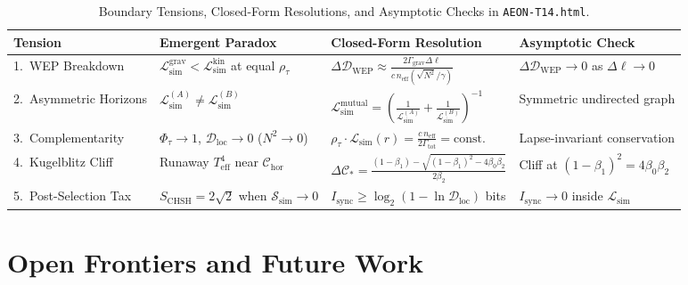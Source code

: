 \documentclass[11pt,a4paper]{article}
\begin{document}
\begin{table}[h!]
\centering
\caption{Boundary Tensions, Closed-Form Resolutions, and Asymptotic Checks in \texttt{AEON-T14.html}.}
\vspace{0.5em}
\small
\begin{tabular}{@{}llll@{}}
\toprule
\textbf{Tension} & \textbf{Emergent Paradox} & \textbf{Closed-Form Resolution} & \textbf{Asymptotic Check} \\
\midrule
1.\ WEP Breakdown & $\mathcal{L}_{\mathrm{sim}}^{\mathrm{grav}} < \mathcal{L}_{\mathrm{sim}}^{\mathrm{kin}}$ at equal $\rho_\tau$ & $\Delta\mathcal{D}_{\mathrm{WEP}} \approx \frac{2\Gamma_{\mathrm{grav}}\Delta\ell}{c\,n_{\mathrm{eff}}(\sqrt{N^2}/\gamma)}$ & $\Delta\mathcal{D}_{\mathrm{WEP}} \to 0$ as $\Delta\ell \to 0$ \\
2.\ Asymmetric Horizons & $\mathcal{L}_{\mathrm{sim}}^{(A)} \neq \mathcal{L}_{\mathrm{sim}}^{(B)}$ & $\mathcal{L}_{\mathrm{sim}}^{\mathrm{mutual}} = \left(\frac{1}{\mathcal{L}_{\mathrm{sim}}^{(A)}} + \frac{1}{\mathcal{L}_{\mathrm{sim}}^{(B)}}\right)^{-1}$ & Symmetric undirected graph \\
3.\ Complementarity & $\Phi_\tau \to 1$, $\mathcal{D}_{\mathrm{loc}} \to 0$ ($N^2 \to 0$) & $\rho_\tau \cdot \mathcal{L}_{\mathrm{sim}}(r) = \frac{c\,n_{\mathrm{eff}}}{2\Gamma_{\mathrm{tot}}} = \mathrm{const.}$ & Lapse-invariant conservation \\
4.\ Kugelblitz Cliff & Runaway $T_{\mathrm{eff}}^4$ near $\mathcal{C}_{\mathrm{hor}}$ & $\Delta\mathcal{C}_* = \frac{(1-\beta_1) - \sqrt{(1-\beta_1)^2 - 4\beta_0\beta_2}}{2\beta_2}$ & Cliff at $(1-\beta_1)^2 = 4\beta_0\beta_2$ \\
5.\ Post-Selection Tax & $S_{\mathrm{CHSH}} = 2\sqrt{2}$ when $\mathcal{S}_{\mathrm{sim}} \to 0$ & $I_{\mathrm{sync}} \ge \log_2(1 - \ln\mathcal{D}_{\mathrm{loc}})$ bits & $I_{\mathrm{sync}} \to 0$ inside $\mathcal{L}_{\mathrm{sim}}$ \\
\bottomrule
\end{tabular}
\end{table}

\section{Open Frontiers and Future Work}
\end{document}
